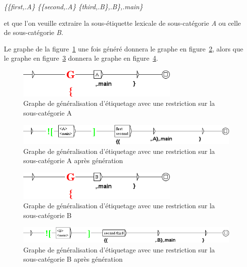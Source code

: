 \emph{\{\{first,.A\} \{\{second,.A\} \{third,.B\},.B\},.main\}}

et que l'on veuille extraire la sous-étiquette lexicale de sous-catégorie \textit{A} ou celle de sous-catégorie \textit{B}.

\bigskip
Le graphe de la figure~\ref{fig:graphe_restriction_A} une fois généré donnera le graphe en figure~\ref{fig:graphe_restriction_A_genere}, alors que le graphe en figure~\ref{fig:graphe_restriction_B} donnera le graphe en figure~\ref{fig:graphe_restriction_B_genere}.


\begin{figure}[!htb]
  \centering
  \includegraphics[width=8cm]{resources/img/graphe_restriction_A.png}
  \caption{Graphe de généralisation d'étiquetage avec une restriction sur la sous-catégorie A}
  \label{fig:graphe_restriction_A}
\end{figure}

\begin{figure}[!htb]
  \centering
  \includegraphics[width=14cm]{resources/img/graphe_restriction_A_genere.png}
  \caption{Graphe de généralisation d'étiquetage avec une restriction sur la sous-catégorie A après génération}
  \label{fig:graphe_restriction_A_genere}
\end{figure}

\begin{figure}[!htb]
  \centering
  \includegraphics[width=8cm]{resources/img/graphe_restriction_B.png}
  \caption{Graphe de généralisation d'étiquetage avec une restriction sur la sous-catégorie B}
  \label{fig:graphe_restriction_B}
\end{figure}

\begin{figure}[!htb]
  \centering
  \includegraphics[width=14cm]{resources/img/graphe_restriction_B_genere.png}
  \caption{Graphe de généralisation d'étiquetage avec une restriction sur la sous-catégorie B après génération}
  \label{fig:graphe_restriction_B_genere}
\end{figure}

